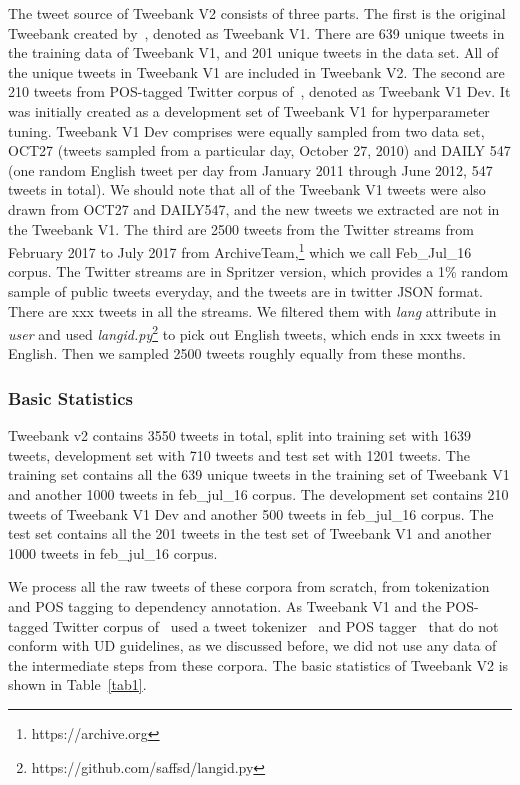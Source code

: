 \documentclass[11pt,letterpaper]{article}
\begin{document}
The tweet source of Tweebank V2 consists of three parts. 
The first is the original Tweebank created by~\cite{kong-EtAl:2014:EMNLP2014}, denoted as Tweebank V1.  There are 639 unique tweets in the training data of Tweebank V1, and 201 unique tweets in the data set. All of the unique tweets in Tweebank V1 are included in Tweebank V2.
The second are 210 tweets from POS-tagged Twitter corpus of~, denoted as Tweebank V1 Dev. It was initially created as a development set of Tweebank V1 for hyperparameter tuning.
Tweebank V1 Dev comprises were equally sampled from two data set, OCT27 (tweets sampled from a particular day, October 27, 2010) and DAILY 547 (one random English tweet per day from January 2011 through June 2012, 547 tweets in total). We should note that all of the Tweebank V1 tweets were also drawn from OCT27 and DAILY547, and the new tweets we extracted are not in the Tweebank V1.
The third are 2500 tweets from the Twitter streams from February 2017 to July 2017 from ArchiveTeam,\footnote{https://archive.org} which we call Feb\_Jul\_16 corpus. The Twitter streams are in Spritzer version, which provides a 1\% random sample of public tweets everyday, and the tweets are in twitter JSON format. 
There are xxx tweets in all the streams. We filtered them with \textit{lang} attribute in \textit{user} and used \textit{langid.py}\footnote{https://github.com/saffsd/langid.py} to pick out English tweets, which ends in xxx tweets in English. Then we sampled 2500 tweets roughly equally from these months.


\subsubsection{Basic Statistics}
Tweebank v2 contains 3550 tweets in total, split into training set with 1639 tweets, development set with 710 tweets and test set with 1201 tweets. 
The training set contains all the 639 unique tweets in the training set of Tweebank V1 and another 1000 tweets in feb\_jul\_16 corpus.
The development set contains 210 tweets of Tweebank V1 Dev and another 500 tweets in feb\_jul\_16 corpus.
The test set contains all the 201 tweets in the test set of Tweebank V1 and another 1000 tweets in feb\_jul\_16 corpus.

We process all the raw tweets of these corpora from scratch, from tokenization and POS tagging to dependency annotation. As Tweebank V1 and the POS-tagged Twitter corpus of~ used a tweet tokenizer~\cite{Krieger10tweetmotif:exploratory} and POS tagger~\cite{Gimpel:2011:PTT:2002736.2002747} that do not conform with UD guidelines, as we discussed before, we did not use any data of the intermediate steps from these corpora. The basic statistics of Tweebank V2 is shown in Table~\ref{tab1}.
\end{document}
